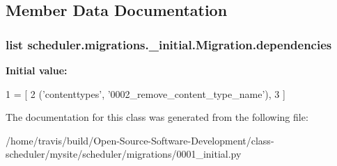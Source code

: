 \subsection{Member Data Documentation}
\hypertarget{classscheduler_1_1migrations_1_10001__initial_1_1_migration_a832c1b4e3b6b97bcb86078337bc7d506}{
\subsubsection[{dependencies}]{\setlength{\rightskip}{0pt plus 5cm}list scheduler.\-migrations.\-\_\-initial.\-Migration.\-dependencies\hspace{0.3cm}{\ttfamily [static]}}}\label{classscheduler_1_1migrations_1_10001__initial_1_1_migration_a832c1b4e3b6b97bcb86078337bc7d506}
{\bfseries Initial value\-:}
\begin{DoxyCode}
1 = [
2         (\textcolor{stringliteral}{'contenttypes'}, \textcolor{stringliteral}{'0002\_remove\_content\_type\_name'}),
3     ]
\end{DoxyCode}


The documentation for this class was generated from the following file\-:\begin{DoxyCompactItemize}
\item 
/home/travis/build/\-Open-\/\-Source-\/\-Software-\/\-Development/class-\/scheduler/mysite/scheduler/migrations/0001\-\_\-initial.\-py\end{DoxyCompactItemize}
